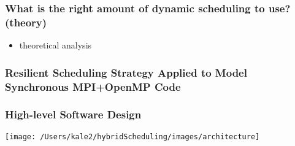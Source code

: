 \begin{frame}
\frametitle{ What is the right amount of dynamic scheduling to use?(theory) }
\begin{itemize}
\item theoretical analysis
\end{itemize}
\end{frame}



\begin{frame}
\frametitle{Resilient Scheduling Strategy Applied to Model Synchronous MPI+OpenMP Code}


\end{frame}

\begin{frame}
\frametitle{High-level Software Design}
\texttt{[image: /Users/kale2/hybridScheduling/images/architecture]}
\end{frame}


